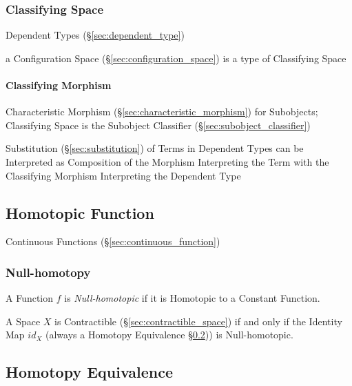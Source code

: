 \subsubsection{Classifying Space}\label{sec:classifying_space}

Dependent Types (\S\ref{sec:dependent_type})

a Configuration Space (\S\ref{sec:configuration_space}) is a type of
Classifying Space



\paragraph{Classifying Morphism}\label{sec:classifying_morphism}\hfill

Characteristic Morphism (\S\ref{sec:characteristic_morphism}) for
Subobjects; Classifying Space is the Subobject Classifier
(\S\ref{sec:subobject_classifier})

Substitution (\S\ref{sec:substitution}) of Terms in Dependent Types
can be Interpreted as Composition of the Morphism Interpreting the
Term with the Classifying Morphism Interpreting the Dependent Type



\subsection{Homotopic Function}\label{sec:homotopic_function}

Continuous Functions (\S\ref{sec:continuous_function})



\subsubsection{Null-homotopy}\label{sec:null_homotopy}

A Function $f$ is \emph{Null-homotopic} if it is Homotopic to a
Constant Function.

A Space $X$ is Contractible (\S\ref{sec:contractible_space}) if and
only if the Identity Map $id_X$ (always a Homotopy Equivalence
\S\ref{sec:homotopy_equivalence})) is Null-homotopic.



\subsection{Homotopy Equivalence}\label{sec:homotopy_equivalence}

